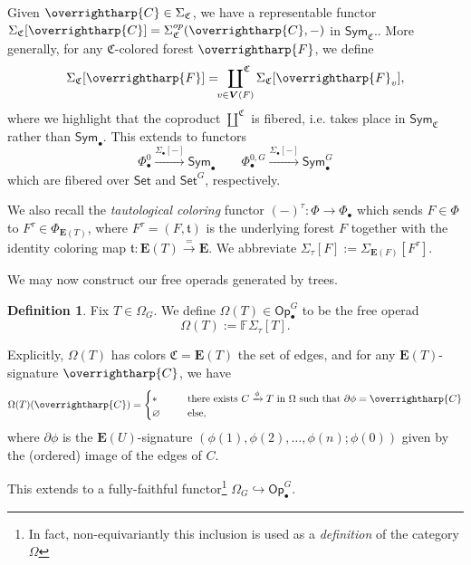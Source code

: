 \documentclass[a4paper,10pt
,draft
]{article}%
\numberwithin{equation}{section}
\numberwithin{figure}{section}
\theoremstyle{definition} %
\newtheorem{definition}[equation]{Definition}%
\newcommand{\into}{\hookrightarrow}%
\newcommand{\vect}[1]{\text{\overrightharp{\ensuremath{#1}}}}
\newcommand{\Sym}{\ensuremath{\mathsf{Sym}}}%
\newcommand{\Set}{\ensuremath{\mathsf{Set}}}
\newcommand{\Op}{\mathsf{Op}}%
\newcommand{\1}{\ensuremath{\mathbbm 1}}%
\begin{document}
Given $\vect C \in \Sigma_{\mathfrak C}$, we have a representable functor $\Sigma_{\mathfrak C}[\vect C] = \Sigma_{\mathfrak C}^{op}(\vect C, -)$ in $\Sym_{\mathfrak C}$..
More generally, for any $\mathfrak C$-colored forest $\vect F$, we define
\[
      \Sigma_{\mathfrak C}[\vect F] = \sideset{}{^{\mathfrak C}}\coprod_{v \in \boldsymbol{V}(F)} \Sigma_{\mathfrak C}[\vect F_v],
\]
where we highlight that the coproduct $\amalg^{\mathfrak C}$ is fibered, i.e. takes place in $\Sym_{\mathfrak C}$ rather than $\Sym_\bullet$.
This extends to functors
\[
      \Phi_\bullet^0 \xrightarrow{\Sigma_\bullet[-]} \Sym_\bullet
      \qquad
      \Phi_\bullet^{0,G} \xrightarrow{\Sigma_\bullet[-]} \Sym_\bullet^G
\]
which are fibered over $\Set$ and $\Set^G$, respectively.

We also recall the \textit{tautological coloring} functor $(-)^\tau \colon \Phi \to \Phi_{\bullet}$
which sends $F \in \Phi$ to $F^\tau \in \Phi_{\boldsymbol{E}(T)}$,
where $F^\tau = (F,\mathfrak t)$ is the underlying forest $F$ together with the identity coloring map $\mathfrak t \colon \boldsymbol{E}(T) \xrightarrow{=} \boldsymbol{E}$.
We abbreviate $\Sigma_\tau[F] := \Sigma_{\boldsymbol{E}(F)}[F^\tau]$.

We may now construct our free operads generated by trees.

\begin{definition}
      \label{OT_DEF}
      Fix $T \in \Omega_G$.
      We define $\Omega(T) \in \Op_\bullet^G$ to be the free operad
      \[
            \Omega(T) := \mathbb F \Sigma_\tau[T].
      \]
\end{definition}
Explicitly, $\Omega(T)$ has colors $\mathfrak C = \boldsymbol{E}(T)$ the set of edges, and
for any $\boldsymbol{E}(T)$-signature $\vect C$, we have
\begin{equation}
      \label{OMEGADEF_EQ}
      \Omega(T)(\vect C) =
      \begin{cases}
            \** \qquad & \mbox{there exists $C \xrightarrow{\phi} T$ in $\Omega$ such that $\partial \phi = \vect C$}
            \\
            \varnothing & \text{else,}
      \end{cases}
\end{equation}
where $\partial \phi$ is the $\mathbf E(U)$-signature $(\phi(1), \phi(2), \dots, \phi(n); \phi(0))$
given by the (ordered) image of the edges of $C$.

This extends to a fully-faithful functor\footnote{In fact, non-equivariantly this inclusion is used as a \textit{definition} of the category $\Omega$} $\Omega_G \into \Op_\bullet^G$.
\end{document}
